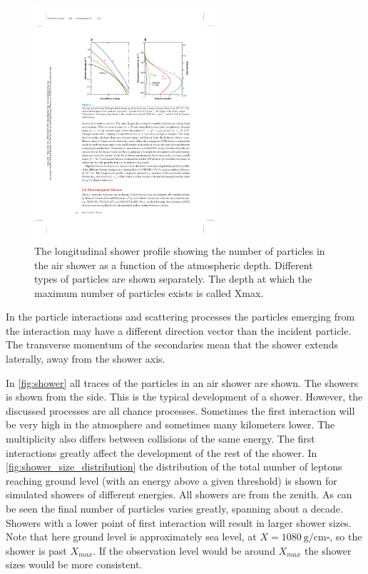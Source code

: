 \begin{figure}
    \centering
    \includegraphics[width=0.6\textwidth]
                    {plots/cosmic-rays/longitudinal_profile}
    \caption{The longitudinal shower profile showing the number of particles in the air shower as a function of the atmospheric depth. Different types of particles are shown separately. The depth at which the maximum number of particles exists is called Xmax. \cite{engel2011eas}}
    \label{fig:longitudinal_profile}
\end{figure}

In the particle interactions and scattering processes the particles emerging from the interaction may have a different direction vector than the incident particle. The transverse momentum of the secondaries mean that the shower extends laterally, away from the shower axis.

In \cref{fig:shower} all traces of the particles in an air shower are shown. The showers is shown from the side. This is the typical development of a shower. However, the discussed processes are all chance processes. Sometimes the first interaction will be very high in the atmosphere and sometimes many kilometers lower. The multiplicity also differs between collisions of the same energy. The first interactions greatly affect the development of the rest of the shower. In \cref{fig:shower_size_distribution} the distribution of the total number of leptons reaching ground level (with an energy above a given threshold) is shown for simulated showers of different energies. All showers are from the zenith. As can be seen the final number of particles varies greatly, spanning about a decade. Showers with a lower point of first interaction will result in larger shower sizes. Note that here ground level is approximately sea level, at $X = \SI{1080}{\gram\per\centi\meter\square}$, so the shower is past $X_{max}$. If the observation level would be around $X_{max}$ the shower sizes would be more consistent.

